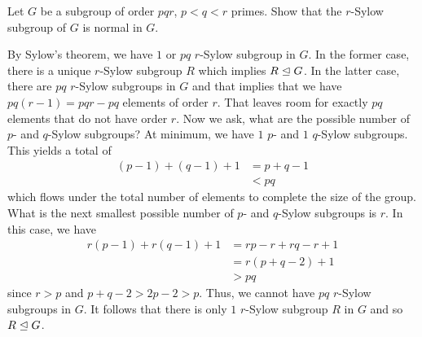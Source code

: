 \begin{problem}
  Let \(G\) be a subgroup of order \(pqr\), \(p<q<r\) primes. Show that the
  \(r\)-Sylow subgroup of \(G\) is normal in \(G\).
\end{problem}
\begin{solution}
  By Sylow's theorem, we have \(1\) or \(pq\) \(r\)-Sylow subgroup in
  \(G\). In the former case, there is a unique \(r\)-Sylow subgroup \(R\)
  which implies \(R\trianglelefteq G\). In the latter case, there are \(pq\)
  \(r\)-Sylow subgroups in \(G\) and that implies that we have
  \(pq(r-1)=pqr-pq\) elements of order \(r\). That leaves room for exactly
  \(pq\) elements that do not have order \(r\). Now we ask, what are the
  possible number of \(p\)- and \(q\)-Sylow subgroups? At minimum, we have
  \(1\) \(p\)- and \(1\) \(q\)-Sylow subgroups. This yields a total of
  \begin{align*}
    (p-1)+(q-1)+1&=p+q-1\\
                 &<pq
  \end{align*}
  which flows under the total number of elements to complete the size of
  the group. What is the next smallest possible number of \(p\)- and
  \(q\)-Sylow subgroups is \(r\). In this case, we have
  \begin{align*}
    r(p-1)+r(q-1)+1&=rp-r+rq-r+1\\
                   &=r(p+q-2)+1\\
                   &>pq
  \end{align*}
  since \(r>p\) and \(p+q-2>2p-2>p\). Thus, we cannot have \(pq\)
  \(r\)-Sylow subgroups in \(G\). It follows that there is only \(1\)
  \(r\)-Sylow subgroup \(R\) in \(G\) and so \(R\trianglelefteq G\).
\end{solution}

